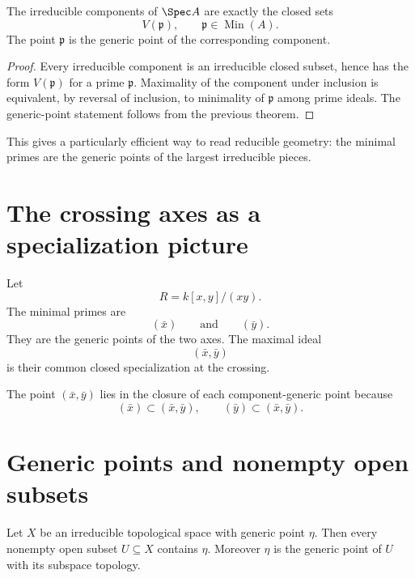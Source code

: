 \begin{theorem}
The irreducible components of $\Spec A$ are exactly the closed sets
\[
V(\mathfrak p),
\qquad
\mathfrak p\in\operatorname{Min}(A).
\]
The point $\mathfrak p$ is the generic point of the corresponding component.
\end{theorem}

\begin{proof}
Every irreducible component is an irreducible closed subset, hence has the form
$V(\mathfrak p)$ for a prime $\mathfrak p$.  Maximality of the component under inclusion is equivalent, by reversal of inclusion, to minimality of $\mathfrak p$ among prime ideals.
The generic-point statement follows from the previous theorem.
\end{proof}



This gives a particularly efficient way to read reducible geometry: the minimal primes are
the generic points of the largest irreducible pieces.

\section{The crossing axes as a specialization picture}

Let
\[
R=k[x,y]/(xy).
\]
The minimal primes are
\[
(\bar x)
\qquad\text{and}\qquad
(\bar y).
\]
They are the generic points of the two axes.  The maximal ideal
\[
(\bar x,\bar y)
\]
is their common closed specialization at the crossing.



The point $(\bar x,\bar y)$ lies in the closure of each component-generic point because
\[
(\bar x)\subset(\bar x,\bar y),
\qquad
(\bar y)\subset(\bar x,\bar y).
\]

\section{Generic points and nonempty open subsets}

\begin{proposition}
Let $X$ be an irreducible topological space with generic point $\eta$.  Then every nonempty
open subset $U\subseteq X$ contains $\eta$.  Moreover $\eta$ is the generic point of $U$
with its subspace topology.
\end{proposition}

